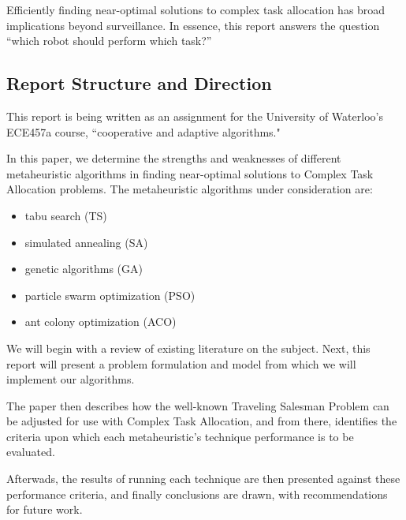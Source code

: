 \documentclass[a4paper]{article}
\begin{document}
Efficiently finding near-optimal solutions to complex task allocation has broad implications beyond surveillance. In essence, this report answers the question ``which robot should perform which task?''\cite{Badreldin}

\subsection{Report Structure and Direction}

This report is being written as an assignment for the University of Waterloo's ECE457a course, ``cooperative and adaptive algorithms."

In this paper, we determine the strengths and weaknesses of different metaheuristic algorithms in finding near-optimal solutions to Complex Task Allocation problems. The metaheuristic algorithms under consideration are:
\begin{itemize}
\item tabu search (TS)
\item simulated annealing (SA)
\item genetic algorithms (GA)
\item particle swarm optimization (PSO)
\item ant colony optimization (ACO)
\end{itemize}

We will begin with a review of existing literature on the subject. Next, this report will present a problem formulation and model from which we will implement our algorithms.

The paper then describes how the well-known Traveling Salesman Problem can be adjusted for use with Complex Task Allocation, and from there, identifies the criteria upon which each metaheuristic's technique performance is to be evaluated.

Afterwads, the results of running each technique are then presented against these performance criteria, and finally conclusions are drawn, with recommendations for future work.


\end{document}
